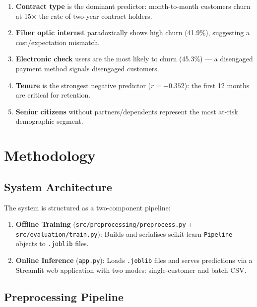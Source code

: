 \documentclass[12pt,a4paper]{article}
\begin{document}
\begin{tcolorbox}[colback=lightgray, colframe=primary, title={\textbf{EDA Summary --- Top Churn Drivers}}]
\begin{enumerate}[leftmargin=1.5em, itemsep=2pt]
    \item \textbf{Contract type} is the dominant predictor: month-to-month customers churn at 15$\times$ the rate of two-year contract holders.
    \item \textbf{Fiber optic internet} paradoxically shows high churn (41.9\%), suggesting a cost/expectation mismatch.
    \item \textbf{Electronic check} users are the most likely to churn (45.3\%) --- a disengaged payment method signals disengaged customers.
    \item \textbf{Tenure} is the strongest negative predictor ($r = -0.352$): the first 12 months are critical for retention.
    \item \textbf{Senior citizens} without partners/dependents represent the most at-risk demographic segment.
\end{enumerate}
\end{tcolorbox}

\section{Methodology}

\subsection{System Architecture}

The system is structured as a two-component pipeline:

\begin{enumerate}[leftmargin=2em]
    \item \textbf{Offline Training} (\texttt{src/preprocessing/preprocess.py} + \texttt{src/evaluation/train.py}): Builds and serialises scikit-learn \texttt{Pipeline} objects to \texttt{.joblib} files.
    \item \textbf{Online Inference} (\texttt{app.py}): Loads \texttt{.joblib} files and serves predictions via a Streamlit web application with two modes: single-customer and batch CSV.
\end{enumerate}

\subsection{Preprocessing Pipeline}
\end{document}
